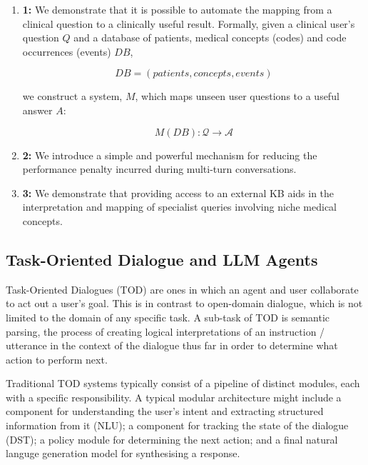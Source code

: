 \documentclass[11pt]{article}
\begin{document}
\begin{enumerate}

\item \textbf{1:} We demonstrate that it is possible to automate the mapping from a clinical question to a clinically useful result. Formally, given a clinical user's question $Q$ and a database of patients, medical concepts (codes) and code occurrences (events) $DB$,

  $$ DB = (patients, concepts, events) $$

we construct a system, $M$, which maps unseen user questions to a useful answer $A$:

  $$ M(DB): \mathcal{Q} \rightarrow \mathcal{A} $$

\item \textbf{2:} We introduce a simple and powerful mechanism for reducing the performance penalty incurred during multi-turn conversations. %

\item \textbf{3:}  We demonstrate that providing access to an external KB aids in the interpretation and mapping of specialist queries involving niche medical concepts.
\end{enumerate}


\subsection{Task-Oriented Dialogue and LLM Agents}
Task-Oriented Dialogues (TOD) are ones in which an agent and user collaborate to act out a user's goal.
This is in contrast to open-domain dialogue, which is not limited to the domain of any specific task.
A sub-task of TOD is semantic parsing, the process of creating logical interpretations of an instruction / utterance in the context of the dialogue thus far in order to determine what action to perform next.

Traditional TOD systems typically consist of a pipeline of distinct modules, each with a specific responsibility.
A typical modular architecture might include a component for understanding the user's intent and extracting structured information from it (NLU); a component for tracking the state of the dialogue (DST); a policy module for determining the next action; and a final natural languge generation model for synthesising a response.  
\end{document}
